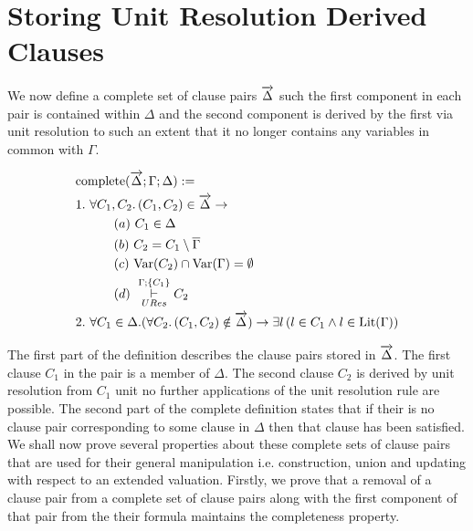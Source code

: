 \section{Storing Unit Resolution Derived Clauses}

We now define a complete set of clause pairs $\overrightarrow{\Delta}$ such the first component in each pair is contained within $\Delta$ and the second component is derived by the first via unit resolution to such an extent that it no longer contains any variables in common with $\Gamma$. \\
\medskip
\begin{mydef}
\begin{align*}
 &\mathrm{complete}(\overrightarrow{\Delta};\Gamma; \Delta) :=  \\
& 1. \ \forall C_1,C_2.  \, (C_1, C_2) \in \overrightarrow{\Delta} \to \\
& \hspace{30pt}  (a) \ C_1 \in \Delta \\
& \hspace{30pt}  (b) \ C_2 = C_1 \setminus \overline{\Gamma} \\
& \hspace{30pt}  (c) \ \mathrm{Var}(C_2) \cap \mathrm{Var}(\Gamma) = \emptyset \\
& \hspace{30pt}  (d) \  \overset{\Gamma;\{C_1 \}}{\underset{URes}{\vdash}} C_2 \\
&2. \ \forall C_1 \in \Delta. (\forall C_2. \, (C_1, C_2 ) \notin \overrightarrow{\Delta}) \to \exists l \, (l \in C_1 \wedge l \in \mathrm{Lit}(\Gamma))
\end{align*}

\end{mydef}
The first part of the definition describes the clause pairs stored in $\overrightarrow{\Delta}$. The first clause $C_1$ in the pair is a member of $\Delta$. The second clause $C_2$ is derived by unit resolution from $C_1$ unit no further applications of the unit resolution rule are possible. The second part of the complete definition states that if their is no clause pair corresponding to some clause in $\Delta$ then that clause has been satisfied. We shall now prove several properties about these complete sets of clause pairs that are used for their general manipulation i.e. construction, union and updating with respect to an extended valuation. Firstly, we prove that a removal of a clause pair from a complete set of clause pairs along with the first component of that pair from the their formula maintains the completeness property. \\
\medskip
